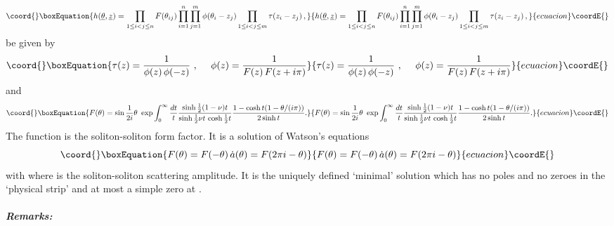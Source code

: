 \documentclass[a4paper,a4paper]{article}
\begin{document}
\begin{equation}\coord{}\boxEquation{
h(\underline{\theta },{\underline{z}})=\prod_{1\le i<j\le n}F(\theta
_{ij})\prod_{i=1}^{n}\prod_{j=1}^{m}\phi (\theta _{i}-z_{j})\prod_{1\le
i<j\le m}\tau (z_{i}-z_{j})\,,  \label{1.3}
}{
h(\underline{\theta },{\underline{z}})=\prod_{1\le i<j\le n}F(\theta
_{ij})\prod_{i=1}^{n}\prod_{j=1}^{m}\phi (\theta _{i}-z_{j})\prod_{1\le
i<j\le m}\tau (z_{i}-z_{j})\,,  }{ecuacion}\coordE{}\end{equation}
be given by 
\begin{equation}\coord{}\boxEquation{
\tau (z)=\frac{1}{\phi (z)\,\phi (-z)}~,~~~~\phi (z)=\frac{1}{F(z)\,F(z+i\pi
)}  \label{1.4}
}{
\tau (z)=\frac{1}{\phi (z)\,\phi (-z)}~,~~~~\phi (z)=\frac{1}{F(z)\,F(z+i\pi
)}  }{ecuacion}\coordE{}\end{equation}
and 
\begin{equation}\coord{}\boxEquation{
F(\theta )=\sin \frac{1}{2i}\theta \,\,\exp \int_{0}^{\infty }\frac{dt}{t}
\frac{\sinh \frac{1}{2}(1-\nu )t}{\sinh \frac{1}{2}\nu t\,\cosh \frac{1}{2}t}
\frac{1-\cosh t(1-\theta /(i\pi ))}{2\sinh t}.  \label{1.7}
}{
F(\theta )=\sin \frac{1}{2i}\theta \,\,\exp \int_{0}^{\infty }\frac{dt}{t}
\frac{\sinh \frac{1}{2}(1-\nu )t}{\sinh \frac{1}{2}\nu t\,\cosh \frac{1}{2}t}
\frac{1-\cosh t(1-\theta /(i\pi ))}{2\sinh t}.  }{ecuacion}\coordE{}\end{equation}
The function \coordHE{} is the soliton-soliton form factor. It is a
solution of Watson's equations 
\begin{equation}\coord{}\boxEquation{
F(\theta )=F(-\theta )\,\dot{a}(\theta )=F(2\pi i-\theta )  \label{2.12}
}{
F(\theta )=F(-\theta )\,\dot{a}(\theta )=F(2\pi i-\theta )  }{ecuacion}\coordE{}\end{equation}
with \coordHE{} where \coordHE{} is the
soliton-soliton scattering amplitude. It is the uniquely defined `minimal'
solution \cite{KW} which has no poles and no zeroes in the `physical strip' \coordHE{} and at most a simple zero at \coordHE{}.

\subparagraph{Remarks:}
\end{document}
